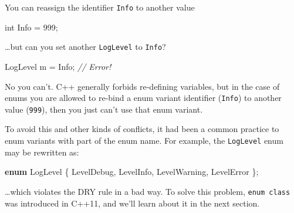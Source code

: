 \documentclass[
]{book}
\newenvironment{Shaded}{\begin{snugshade}}{\end{snugshade}}
\newcommand{\CommentTok}[1]{\textcolor[rgb]{0.56,0.35,0.01}{\textit{#1}}}
\newcommand{\DataTypeTok}[1]{\textcolor[rgb]{0.13,0.29,0.53}{#1}}
\newcommand{\DecValTok}[1]{\textcolor[rgb]{0.00,0.00,0.81}{#1}}
\newcommand{\KeywordTok}[1]{\textcolor[rgb]{0.13,0.29,0.53}{\textbf{#1}}}
\newcommand{\NormalTok}[1]{#1}
\begin{document}
You can reassign the identifier \texttt{Info} to another value

\begin{Shaded}
\begin{Highlighting}[]
\DataTypeTok{int}\NormalTok{ Info = }\DecValTok{999}\NormalTok{;}
\end{Highlighting}
\end{Shaded}

\ldots but can you set another \texttt{LogLevel} to \texttt{Info}?

\begin{Shaded}
\begin{Highlighting}[]
\NormalTok{LogLevel m = Info; }\CommentTok{// Error!}
\end{Highlighting}
\end{Shaded}

No you can't. C++ generally forbids re-defining variables, but in the case of
enums you are allowed to re-bind a enum variant identifier (\texttt{Info}) to another
value (\texttt{999}), then you just can't use that enum variant.

To avoid this and other kinds of conflicts, it had been a common practice to
enum variants with part of the enum name. For example, the \texttt{LogLevel} enum
may be rewritten as:

\begin{Shaded}
\begin{Highlighting}[]
\KeywordTok{enum}\NormalTok{ LogLevel}
\NormalTok{\{}
\NormalTok{    LevelDebug,}
\NormalTok{    LevelInfo,}
\NormalTok{    LevelWarning,}
\NormalTok{    LevelError}
\NormalTok{\};}
\end{Highlighting}
\end{Shaded}

\ldots which violates the DRY rule in a bad way. To solve this problem, \texttt{enum\ class} was introduced
in C++11, and we'll learn about it in the next section.

  
\end{document}
